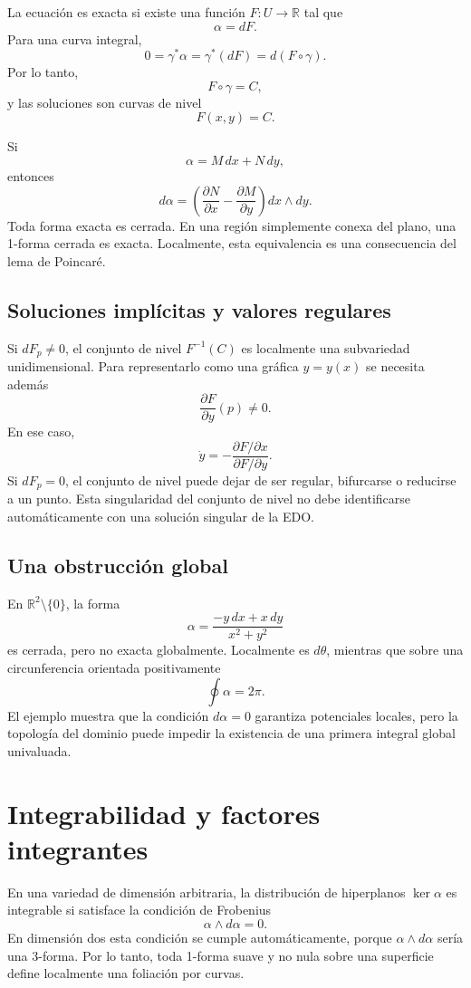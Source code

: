 \documentclass[12pt,a4paper]{article}
\newcommand{\R}{\mathbb{R}}
\begin{document}
	La ecuación es exacta si existe una función \(F\colon U\to\R\) tal que
	\[
	\alpha=dF.
	\]
Para una curva integral,
	\[
	0
	=
	\gamma^*\alpha
	=
	\gamma^*(dF)
	=
	d(F\circ\gamma).
	\]
Por lo tanto,
	\[
	F\circ\gamma=C,
	\]
y las soluciones son curvas de nivel
	\[
	F(x,y)=C.
	\]

	Si
	\[
	\alpha=M\,dx+N\,dy,
	\]
entonces
	\[
	d\alpha
	=
	\left(
	\frac{\partial N}{\partial x}
	-
	\frac{\partial M}{\partial y}
	\right)
	dx\wedge dy.
	\]
Toda forma exacta es cerrada. En una región simplemente conexa del plano, una 1-forma cerrada es exacta. Localmente, esta equivalencia es una consecuencia del lema de Poincaré.

	\subsection{Soluciones implícitas y valores regulares}

	Si \(dF_p\neq 0\), el conjunto de nivel \(F^{-1}(C)\) es localmente una subvariedad unidimensional. Para representarlo como una gráfica \(y=y(x)\) se necesita además
	\[
	\frac{\partial F}{\partial y}(p)\neq 0.
	\]
En ese caso,
	\[
	\dot{y}
	=
	-\frac{\partial F/\partial x}{\partial F/\partial y}.
	\]
Si \(dF_p=0\), el conjunto de nivel puede dejar de ser regular, bifurcarse o reducirse a un punto. Esta singularidad del conjunto de nivel no debe identificarse automáticamente con una solución singular de la EDO.

	\subsection{Una obstrucción global}

	En \(\R^2\setminus\{0\}\), la forma
	\[
	\alpha
	=
	\frac{-y\,dx+x\,dy}{x^2+y^2}
	\]
es cerrada, pero no exacta globalmente. Localmente es \(d\theta\), mientras que sobre una circunferencia orientada positivamente
	\[
	\oint \alpha=2\pi.
	\]
El ejemplo muestra que la condición \(d\alpha=0\) garantiza potenciales locales, pero la topología del dominio puede impedir la existencia de una primera integral global univaluada.

	\clearpage
	\section{Integrabilidad y factores integrantes}

	En una variedad de dimensión arbitraria, la distribución de hiperplanos \(\ker\alpha\) es integrable si satisface la condición de Frobenius
	\[
	\alpha\wedge d\alpha=0.
	\]
En dimensión dos esta condición se cumple automáticamente, porque \(\alpha\wedge d\alpha\) sería una 3-forma. Por lo tanto, toda 1-forma suave y no nula sobre una superficie define localmente una foliación por curvas.
\end{document}
